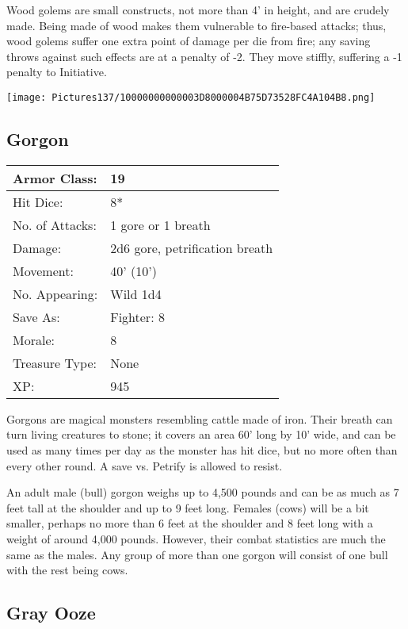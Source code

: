 \documentclass[a4paper,twoside,openany,10pt]{book}
\begin{document}
\begin{multicols}{2}
Wood golems are small constructs, not more than 4' in height, and are crudely made. Being made of wood makes them vulnerable to fire-based attacks; thus, wood golems suffer one extra point of damage per die from fire; any saving throws against such effects are at a penalty of -2. They move stiffly, suffering a -1 penalty to Initiative.

\begin{center}
	\texttt{[image: Pictures137/10000000000003D8000004B75D73528FC4A104B8.png]}
\end{center}

\subsection*{Gorgon}\label{gorgon}

\begin{tabularx}{0.48\textwidth}{@{}lX@{}}
Armor Class: & 19 \\\hline
Hit Dice: & 8* \\\hline
No. of Attacks: & 1 gore or 1 breath \\\hline
Damage: & 2d6 gore, petrification breath \\\hline
Movement: & 40' (10') \\\hline
No. Appearing: & Wild 1d4 \\\hline
Save As: & Fighter: 8 \\\hline
Morale: & 8 \\\hline
Treasure Type: & None \\\hline
XP: & 945 \\\hline
\end{tabularx}\medskip

Gorgons are magical monsters resembling cattle made of iron. Their breath can turn living creatures to stone; it covers an area 60' long by 10' wide, and can be used as many times per day as the monster has hit dice, but no more often than every other round. A save vs. Petrify is allowed to resist. 

An adult male (bull) gorgon weighs up to 4,500 pounds and can be as much as 7 feet tall at the shoulder and up to 9 feet long. Females (cows) will be a bit smaller, perhaps no more than 6 feet at the shoulder and 8 feet long with a weight of around 4,000 pounds. However, their combat statistics are much the same as the males. Any group of more than one gorgon will consist of one bull with the rest being cows.

\subsection*{Gray Ooze}\label{gray-ooze}


\end{multicols}
\end{document}
